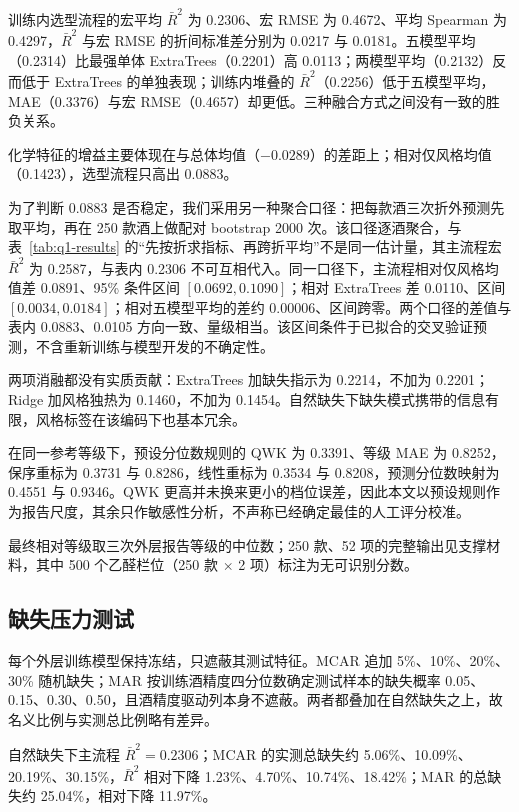 \documentclass[UTF8,a4paper,zihao=-4]{ctexart}
\numberwithin{figure}{section}
\numberwithin{table}{section}
\numberwithin{equation}{section}
\begin{document}
训练内选型流程的宏平均 $\bar R^2$ 为 0.2306、宏 RMSE 为 0.4672、平均 Spearman 为 0.4297，$\bar R^2$ 与宏 RMSE 的折间标准差分别为 0.0217 与 0.0181。五模型平均（0.2314）比最强单体 ExtraTrees（0.2201）高 0.0113；两模型平均（0.2132）反而低于 ExtraTrees 的单独表现；训练内堆叠的 $\bar R^2$（0.2256）低于五模型平均，MAE（0.3376）与宏 RMSE（0.4657）却更低。三种融合方式之间没有一致的胜负关系。

化学特征的增益主要体现在与总体均值（$-0.0289$）的差距上；相对仅风格均值（0.1423），选型流程只高出 0.0883。

为了判断 0.0883 是否稳定，我们采用另一种聚合口径：把每款酒三次折外预测先取平均，再在 250 款酒上做配对 bootstrap 2000 次。该口径逐酒聚合，与表~\ref{tab:q1-results} 的“先按折求指标、再跨折平均”不是同一估计量，其主流程宏 $\bar R^2$ 为 0.2587，与表内 0.2306 不可互相代入。同一口径下，主流程相对仅风格均值差 0.0891、95\% 条件区间 $[0.0692,0.1090]$；相对 ExtraTrees 差 0.0110、区间 $[0.0034,0.0184]$；相对五模型平均的差约 0.00006、区间跨零。两个口径的差值与表内 0.0883、0.0105 方向一致、量级相当。该区间条件于已拟合的交叉验证预测，不含重新训练与模型开发的不确定性。

两项消融都没有实质贡献：ExtraTrees 加缺失指示为 0.2214，不加为 0.2201；Ridge 加风格独热为 0.1460，不加为 0.1454。自然缺失下缺失模式携带的信息有限，风格标签在该编码下也基本冗余。

在同一参考等级下，预设分位数规则的 QWK 为 0.3391、等级 MAE 为 0.8252，保序重标为 0.3731 与 0.8286，线性重标为 0.3534 与 0.8208，预测分位数映射为 0.4551 与 0.9346。QWK 更高并未换来更小的档位误差，因此本文以预设规则作为报告尺度，其余只作敏感性分析，不声称已经确定最佳的人工评分校准。

最终相对等级取三次外层报告等级的中位数；250 款、52 项的完整输出见支撑材料，其中 500 个乙醛栏位（250 款 $\times$ 2 项）标注为无可识别分数。

\subsection{缺失压力测试}

每个外层训练模型保持冻结，只遮蔽其测试特征。MCAR 追加 5\%、10\%、20\%、30\% 随机缺失；MAR 按训练酒精度四分位数确定测试样本的缺失概率 0.05、0.15、0.30、0.50，且酒精度驱动列本身不遮蔽。两者都叠加在自然缺失之上，故名义比例与实测总比例略有差异。

自然缺失下主流程 $\bar R^2=0.2306$；MCAR 的实测总缺失约 5.06\%、10.09\%、20.19\%、30.15\%，$\bar R^2$ 相对下降 1.23\%、4.70\%、10.74\%、18.42\%；MAR 的总缺失约 25.04\%，相对下降 11.97\%。
\end{document}
